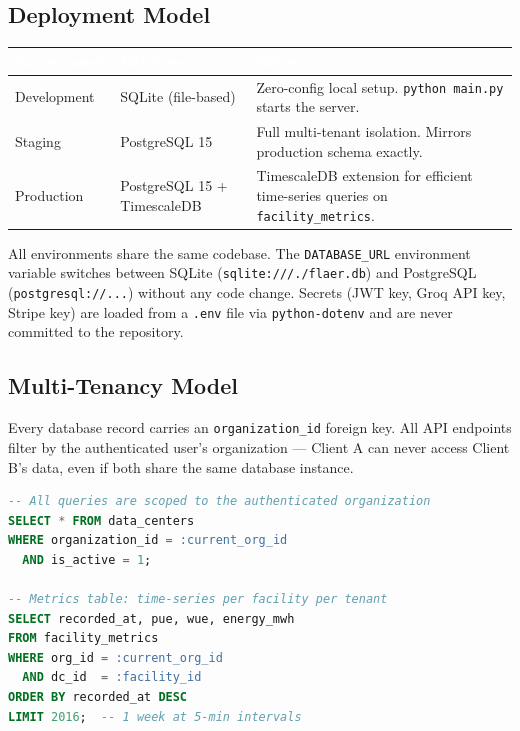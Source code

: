 \documentclass[11pt, a4paper]{article}
\newcommand{\tableheader}[1]{\cellcolor{flaergreen!90}\textcolor{white}{\textbf{\small #1}}}
\begin{document}
\vspace{0.5cm}

\subsection{Deployment Model}

\begin{tabular}{p{2.8cm} p{3.5cm} p{7.8cm}}
  \toprule
  \tableheader{Environment} & \tableheader{Database} & \tableheader{Notes} \\
  \midrule
  Development  & SQLite (file-based)   & Zero-config local setup. \texttt{python main.py} starts the server. \\
  \rowcolor{rowalt} Staging      & PostgreSQL 15         & Full multi-tenant isolation. Mirrors production schema exactly. \\
  Production   & PostgreSQL 15 + TimescaleDB & TimescaleDB extension for efficient time-series queries on \texttt{facility\_metrics}. \\
  \bottomrule
\end{tabular}

\vspace{0.4cm}

All environments share the same codebase. The \texttt{DATABASE\_URL} environment variable switches between SQLite (\texttt{sqlite:///./flaer.db}) and PostgreSQL (\texttt{postgresql://...}) without any code change. Secrets (JWT key, Groq API key, Stripe key) are loaded from a \texttt{.env} file via \texttt{python-dotenv} and are never committed to the repository.

\subsection{Multi-Tenancy Model}

Every database record carries an \texttt{organization\_id} foreign key. All API endpoints filter by the authenticated user's organization — Client A can never access Client B's data, even if both share the same database instance.

\begin{lstlisting}[language=SQL, caption=Tenant isolation example]
-- All queries are scoped to the authenticated organization
SELECT * FROM data_centers
WHERE organization_id = :current_org_id
  AND is_active = 1;

-- Metrics table: time-series per facility per tenant
SELECT recorded_at, pue, wue, energy_mwh
FROM facility_metrics
WHERE org_id = :current_org_id
  AND dc_id  = :facility_id
ORDER BY recorded_at DESC
LIMIT 2016;  -- 1 week at 5-min intervals
\end{lstlisting}
\end{document}
